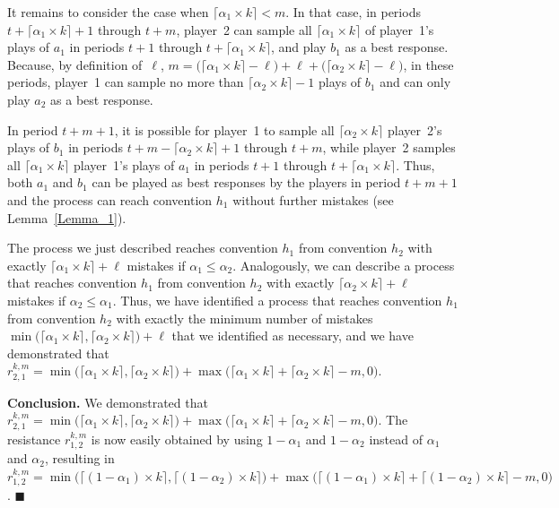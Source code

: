 It remains to consider the case when $\lceil \alpha_1 \times k \rceil <m$.
%
In that case, in periods $t+\lceil \alpha_1 \times k \rceil + 1$ through $t + m$, player~2 can sample all $\lceil \alpha_1 \times k \rceil$ of player~1's plays of $a_1$ in periods $t+1$ through $t+\lceil \alpha_1 \times k \rceil$, and play $b_1$ as a best response.
%
Because, by definition of~$\ell$, $m = \big(\lceil \alpha_1 \times k \rceil -\ell \big) + \ell + \big(\lceil \alpha_2 \times k \rceil -\ell\big)$, in these periods, player~1 can sample no more than $\lceil \alpha_2 \times k \rceil - 1$ plays of $b_1$ and can only play $a_2$ as a best response. 

In period $t + m + 1$, it is possible for player~1 to sample all $\lceil \alpha_2 \times k \rceil$ player~2's plays of $b_1$ in periods $t+m-\lceil \alpha_2 \times k \rceil +1$ through $t + m$, 
while player~2 samples all $\lceil \alpha_1 \times k \rceil$ player~1's plays of $a_1$ in periods $t+1$ through $t+\lceil \alpha_1 \times k \rceil$.
% 
Thus, both $a_1$ and $b_1$ can be played as best responses by the players in period $t + m+1$ and the process can reach convention $h_1$ without further mistakes (see Lemma~\ref{Lemma_1}). 



The  process we just described reaches convention $h_1$ from convention $h_2$ with exactly $\lceil \alpha_1 \times k \rceil +\ell$ mistakes if $\alpha_1\leq \alpha_2$. Analogously, we can describe a process that reaches convention $h_1$ from convention $h_2$ with exactly $\lceil \alpha_2 \times k \rceil +\ell$ mistakes if $\alpha_2\leq \alpha_1$. 
%
Thus, we have identified a process that reaches convention $h_1$ from convention $h_2$ with exactly the minimum number of mistakes $\min\big(\lceil \alpha_1 \times k \rceil,\lceil \alpha_2 \times k \rceil\big) + \ell$ that we identified as necessary, and we have demonstrated that $r_{2,1}^{k,m} = 
\min\big(\lceil \alpha_1 \times k \rceil,\lceil \alpha_2 \times k \rceil\big) + \max\big(\lceil\alpha_1\times k\rceil+\lceil \alpha_2 \times k \rceil-m,0\big)$.


{\bf Conclusion.} We demonstrated that $r^{k,m}_{2,1}=\min\big(\lceil \alpha_1 \times k \rceil,\lceil \alpha_2 \times k \rceil\big)+\max\big(\lceil \alpha_1 \times k \rceil+\lceil \alpha_2 \times k \rceil-m,0\big)$. 
The resistance $r^{k,m}_{1,2}$ is now easily obtained by using $1-\alpha_1$ and $1-\alpha_2$ instead of $\alpha_1$ and $\alpha_2$, resulting in $r^{k,m}_{1,2}=\min\big(\lceil (1-\alpha_1) \times k \rceil,\lceil (1-\alpha_2) \times  k \rceil\big)+\max\big(\lceil (1-\alpha_1) \times k \rceil+\lceil (1-\alpha_2) \times k \rceil-m,0\big)$.
$\blacksquare$

